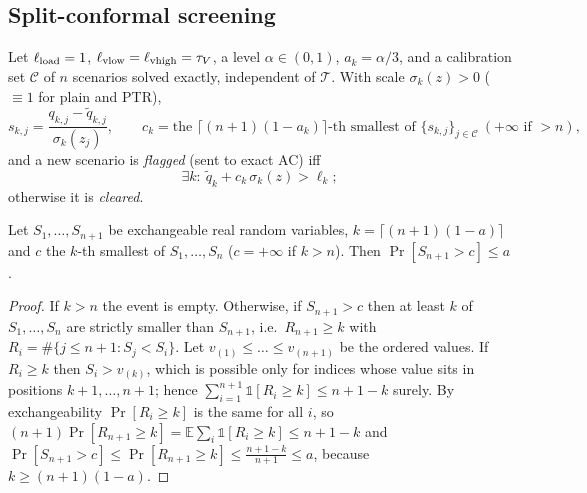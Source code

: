 \subsection{Split-conformal screening}
Let $\ell_{\rm load}=1$, $\ell_{\rm vlow}=\ell_{\rm vhigh}=\tau_V$, a level $\alpha\in(0,1)$,
$a_k=\alpha/3$, and a calibration set $\mathcal C$ of $n$ scenarios solved exactly,
independent of $\mathcal T$. With scale $\sigma_k(z)>0$ ($\equiv1$ for plain and PTR),
\begin{equation}
s_{k,j}=\frac{q_{k,j}-\tilde q_{k,j}}{\sigma_k(z_j)},\qquad
c_k=\text{the }\big\lceil(n+1)(1-a_k)\big\rceil\text{-th smallest of }\{s_{k,j}\}_{j\in\mathcal C}\ (+\infty\text{ if }>n),
\label{eq:ck}
\end{equation}
and a new scenario is \emph{flagged} (sent to exact AC) iff
\begin{equation}
\exists k:\ \tilde q_k+c_k\,\sigma_k(z)>\ell_k ;
\label{eq:flag}
\end{equation}
otherwise it is \emph{cleared}.

\begin{lemma}\label{lem:conf}
Let $S_1,\dots,S_{n+1}$ be exchangeable real random variables, $k=\lceil(n+1)(1-a)\rceil$ and
$c$ the $k$-th smallest of $S_1,\dots,S_n$ ($c=+\infty$ if $k>n$). Then
$\Pr[S_{n+1}>c]\le a$.
\end{lemma}
\begin{proof}
If $k>n$ the event is empty. Otherwise, if $S_{n+1}>c$ then at least $k$ of
$S_1,\dots,S_n$ are strictly smaller than $S_{n+1}$, i.e.\ $R_{n+1}\ge k$ with
$R_i=\#\{j\le n+1:S_j<S_i\}$. Let $v_{(1)}\le\dots\le v_{(n+1)}$ be the ordered values. If
$R_i\ge k$ then $S_i>v_{(k)}$, which is possible only for indices whose value sits in
positions $k+1,\dots,n+1$; hence $\sum_{i=1}^{n+1}\mathbb 1[R_i\ge k]\le n+1-k$ surely. By
exchangeability $\Pr[R_i\ge k]$ is the same for all $i$, so
$(n+1)\Pr[R_{n+1}\ge k]=\mathbb E\sum_i\mathbb 1[R_i\ge k]\le n+1-k$ and
$\Pr[S_{n+1}>c]\le\Pr[R_{n+1}\ge k]\le\frac{n+1-k}{n+1}\le a$, because $k\ge(n+1)(1-a)$.
\end{proof}

